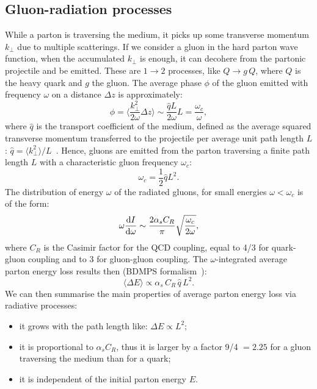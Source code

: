 \subsection{Gluon-radiation processes}
\label{sec:rad}
While a parton is traversing the medium, it picks up some transverse 
momentum $k_{\perp}$ due to multiple scatterings. 
If we consider a gluon in the hard parton wave function, when the 
accumulated $k_{\perp}$ is enough, it can decohere from the partonic projectile and be emitted.
These are $1 \rightarrow 2$ processes, like $Q \rightarrow g\, Q$, 
where $Q$ is the heavy quark and $g$ the gluon.
The average phase $\phi$ of the gluon emitted with frequency $\omega$ on a distance $\Delta z$ is approximately:
\begin{equation}
\label{eq:gluonPhase}
\phi = {\Big \langle} \frac{k_{\perp}^2}{2\omega} \Delta z {\Big \rangle} \sim \frac{\hat{q} L}{2 \omega} L = \frac{\omega_c}{\omega},
\end{equation}
where $\hat{q}$ is the transport coefficient of the medium, 
defined as the average squared transverse 
momentum transferred to the projectile per average unit path 
length $L$: $\hat{q} = \langle k_{\perp}^2 \rangle / L$~\cite{Salgado:2003gb}.
Hence, gluons are emitted from the parton traversing a finite path 
length $L$ with a characteristic gluon frequency $\omega_c$:
\begin{equation}
\label{eq:gluonPhase}
\omega_c = \frac{1}{2} \hat{q} L^2.
\end{equation}
The distribution of energy $\omega$ of the radiated gluons, 
for small energies $\omega < \omega_c$ is of the form:
\begin{equation}
\label{eq:gluonEnDistrb}
\omega \frac{{\rm d} I}{{\rm d} \omega} \sim \frac{2 \alpha_s C_R}{\pi} \sqrt{ \frac{\omega_c}{2 \omega}},
\end{equation}
where $C_R$ is the Casimir factor for the QCD coupling, 
equal to 4/3 for quark-gluon coupling and to 3 for gluon-gluon coupling.
The $\omega$-integrated average parton energy loss results then (BDMPS formalism~\cite{Salgado:2003gb}):
\begin{equation}
\label{eq:RadEnLoss}
\langle \Delta E \rangle \propto \alpha_s \, C_R \, \hat{q} \, L^2. 
\end{equation}
We can then summarise the main properties of average parton 
energy loss via radiative processes:
\begin{itemize}
\item it grows with the path length like: $\Delta E \propto L^2$;
\item it is proportional to $\alpha_s C_R$, thus it is larger by a factor 
9/4 $ = 2.25$ for a gluon traversing the medium than for a quark;
\item it is independent of the initial parton energy $E$.
\end{itemize}
